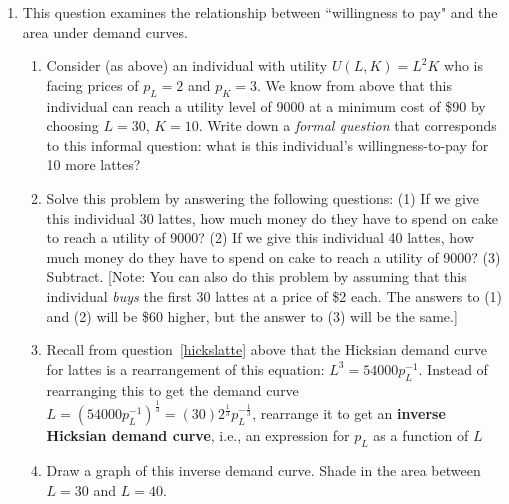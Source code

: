 \begin{enumerate}
\item This question examines the relationship between ``willingness to pay" and the area under demand curves.

    \begin{enumerate}

    \item Consider (as above) an individual with utility $U(L,K)=L^2K$ who is facing prices of $p_L=2$ and $p_K=3$. We know from above that this individual can reach a utility level of 9000 at a minimum cost of \$90 by choosing $L=30$, $K=10$. Write down a \emph{formal question} that corresponds to this informal question: what is this individual's willingness-to-pay for 10 more lattes?


    \item Solve this problem by answering the following questions: (1) If we give this individual 30 lattes, how much money do they have to spend on cake to reach a utility of 9000? (2) If we give this individual 40 lattes, how much money do they have to spend on cake to reach a utility of 9000? (3) Subtract. [Note: You can also do this problem by assuming that this individual \emph{buys} the first 30 lattes at a price of \$2 each. The answers to (1) and (2) will be \$60 higher, but the answer to (3) will be the same.]


    \item Recall from question~\ref{hickslatte} above that the Hicksian demand curve for lattes is a rearrangement of this equation: $L^3=54000p_L^{-1}$. Instead of rearranging this to get the demand curve $L=\left(54000p_L^{-1}\right)^{\frac{1}{3}}=(30)2^{\frac{1}{3}}p_L^{-\frac{1}{3}}$, rearrange it to get an \textbf{inverse Hicksian demand curve}, i.e., an expression for $p_L$ as a function of $L$


    \item Draw a graph of this inverse demand curve. Shade in the area between $L=30$ and $L=40$.
\end{enumerate}
\end{enumerate}
